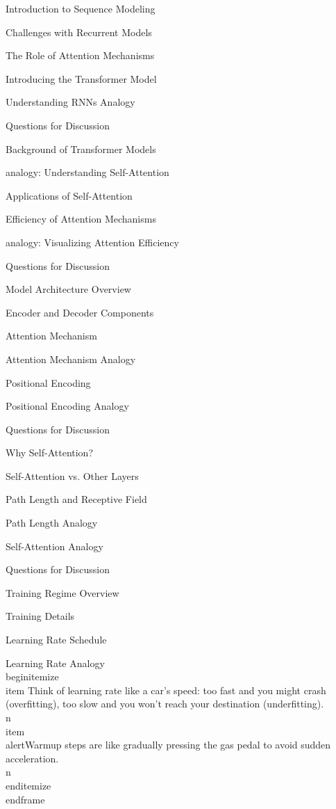 \documentclass{beamer}
\begin{document}
\begin{frame}[]{Introduction to Sequence Modeling}
\begin{frame}[]{Challenges with Recurrent Models}
\begin{frame}[]{The Role of Attention Mechanisms}
\begin{frame}[]{Introducing the Transformer Model}
\begin{frame}[plain]{Understanding RNNs Analogy}
\begin{frame}[]{Questions for Discussion}
\begin{frame}[]{Background of Transformer Models}
\begin{frame}[plain]{analogy: Understanding Self-Attention}
\begin{frame}[]{Applications of Self-Attention}
\begin{frame}[]{Efficiency of Attention Mechanisms}
\begin{frame}[plain]{analogy: Visualizing Attention Efficiency}
\begin{frame}[]{Questions for Discussion}
\begin{frame}[]{Model Architecture Overview}
\begin{frame}[]{Encoder and Decoder Components}
\begin{frame}[]{Attention Mechanism}
\begin{frame}[plain]{Attention Mechanism Analogy}
\begin{frame}[]{Positional Encoding}
\begin{frame}[plain]{Positional Encoding Analogy}
\begin{frame}[]{Questions for Discussion}
\begin{frame}[]{Why Self-Attention?}
\begin{frame}[]{Self-Attention vs. Other Layers}
\begin{frame}[]{Path Length and Receptive Field}
\begin{frame}[plain]{Path Length Analogy}
\begin{frame}[plain]{Self-Attention Analogy}
\begin{frame}[]{Questions for Discussion}
\begin{frame}[]{Training Regime Overview}
\begin{frame}[]{Training Details}
\begin{frame}[]{Learning Rate Schedule}
\begingroup
{}\n{}\n\begin{frame}[plain]{Learning Rate Analogy}\n\\begin{itemize}
\\item Think of learning rate like a car's speed: too fast and you might crash (overfitting), too slow and you won't reach your destination (underfitting).\\n\\item \\alert{Warmup steps are like gradually pressing the gas pedal to avoid sudden acceleration.}\\n\\end{itemize}
\\end{frame}

\endgroup


\end{frame}
\end{frame}
\end{frame}
\end{frame}
\end{frame}
\end{frame}
\end{frame}
\end{frame}
\end{frame}
\end{frame}
\end{frame}
\end{frame}
\end{frame}
\end{frame}
\end{frame}
\end{frame}
\end{frame}
\end{frame}
\end{frame}
\end{frame}
\end{frame}
\end{frame}
\end{frame}
\end{frame}
\end{frame}
\end{frame}
\end{frame}
\end{frame}
\end{frame}
\end{document}
